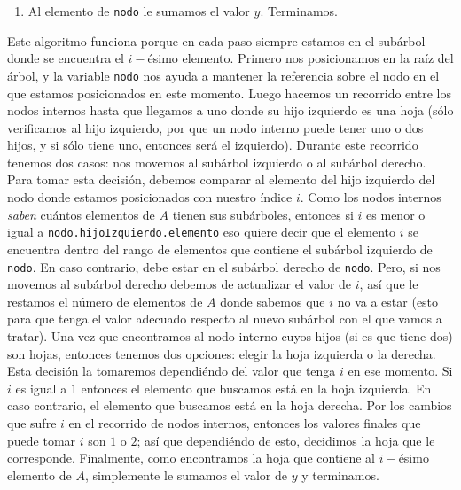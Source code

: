 \documentclass[letterpaper,11pt]{article}
\begin{document}
\begin{enumerate}
\begin{itemize}
\begin{enumerate}
            \item Al elemento de \texttt{nodo} le sumamos el valor $y$. 
            Terminamos. 
        \end{enumerate}

        Este algoritmo funciona porque en cada paso siempre estamos en el 
        subárbol donde se encuentra el $i-$ésimo elemento. Primero nos 
        posicionamos en la raíz del árbol, y la variable \texttt{nodo} nos 
        ayuda a mantener la referencia sobre el nodo en el que estamos 
        posicionados en este momento. Luego hacemos un recorrido entre los
        nodos internos hasta que llegamos a uno donde su hijo izquierdo es 
        una hoja (sólo verificamos al hijo izquierdo, por que un nodo interno 
        puede tener uno o dos hijos, y si sólo tiene uno, entonces será el 
        izquierdo). Durante este recorrido tenemos dos casos: nos movemos al 
        subárbol izquierdo o al subárbol derecho. Para tomar esta decisión, 
        debemos comparar al elemento del hijo izquierdo del nodo donde estamos 
        posicionados con nuestro índice $i$. Como los nodos internos 
        \textit{saben} cuántos elementos de $A$ tienen sus subárboles, 
        entonces si $i$ es menor o igual a \texttt{nodo.hijoIzquierdo.elemento}
        eso quiere decir que el elemento $i$ se encuentra dentro del rango 
        de elementos que contiene el subárbol izquierdo de \texttt{nodo}. En 
        caso contrario, debe estar en el subárbol derecho de \texttt{nodo}. 
        Pero, si nos movemos al subárbol derecho debemos de actualizar el 
        valor de $i$, así que le restamos el número de elementos de $A$ donde 
        sabemos que $i$ no va a estar (esto para que tenga el valor adecuado 
        respecto al nuevo subárbol con el que vamos a tratar). Una vez que 
        encontramos al nodo interno cuyos hijos (si es que tiene dos) son 
        hojas, entonces tenemos dos opciones: elegir la hoja izquierda o la 
        derecha. Esta decisión la tomaremos dependiéndo del valor que tenga 
        $i$ en ese momento. Si $i$ es igual a $1$ entonces el elemento que 
        buscamos está en la hoja izquierda. En caso contrario, el elemento que 
        buscamos está en la hoja derecha. Por los cambios que sufre $i$ en el 
        recorrido de nodos internos, entonces los valores finales que puede 
        tomar $i$ son $1$ o $2$; así que dependiéndo de esto, decidimos la 
        hoja que le corresponde. Finalmente, como encontramos la hoja que
        contiene al $i-$ésimo elemento de $A$, simplemente le sumamos el 
        valor de $y$ y terminamos. 


\end{itemize}
\end{enumerate}
\end{document}
